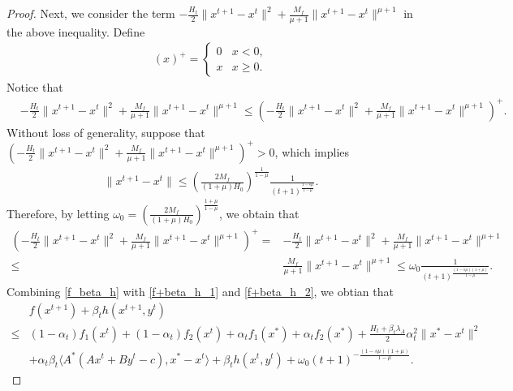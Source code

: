 \documentclass{article}
\numberwithin{equation}{section}
\begin{document}
\begin{proof}
    Next, we consider the term $-\frac{H_t}{2}\|x^{t+1}-x^t\rVert^2 +\frac{M_f}{\mu+1}\|x^{t+1}-x^t\rVert^{\mu+1}$ in 
    the above inequality. 
    Define 
    \begin{align}
        (x)^+ = \left\{ 
        \begin{array}{cc}
            0  & x<0,  \nonumber \\
            x & x \geq 0.  \nonumber
        \end{array}
     \right.  \nonumber
    \end{align}
    Notice that 
    \begin{align}
        &-\frac{H_t}{2}\|x^{t+1}-x^t\rVert^2 +\frac{M_f}{\mu+1}\|x^{t+1}-x^t\rVert^{\mu+1} \leq \left(-\frac{H_t}{2}\|x^{t+1}-x^t\rVert^2 +\frac{M_f}{\mu+1}\|x^{t+1}-x^t\rVert^{\mu+1}\right)^+.
        \label{f+beta_h_1}
    \end{align}
    Without loss of generality, suppose that  $\left(-\frac{H_t}{2}\|x^{t+1}-x^t\rVert^2 +\frac{M_f}{\mu+1}\|x^{t+1}-x^t\rVert^{\mu+1}\right)^+ >0$, 
    which implies
    \begin{align}
        \|x^{t+1}-x^t\rVert \leq \left(\frac{2M_f}{(1+\mu)H_0}\right)^{\frac{1}{1-\mu}}\frac{1}{(t+1)^{\frac{1-s\mu}{1-\mu}}}. 
    \end{align}
    Therefore, by letting $\omega_0 = \left(\frac{2M_f}{(1+\mu)H_0}\right)^{\frac{1+\mu}{1-\mu}}$, we obtain that 
    \begin{align}
        \left(-\frac{H_t}{2}\|x^{t+1}-x^t\rVert^2 +\frac{M_f}{\mu+1}\|x^{t+1}-x^t\rVert^{\mu+1}\right)^+ =& -\frac{H_t}{2}\|x^{t+1}-x^t\rVert^2 +\frac{M_f}{\mu+1}\|x^{t+1}-x^t\rVert^{\mu+1} \nonumber \\
        \leq& \frac{M_f}{\mu+1}\|x^{t+1}-x^t\rVert^{\mu+1} \leq \omega_0 \frac{1}{(t+1)^{\frac{(1-s\mu)(1+\mu)}{1-\mu}}}. 
        \label{f+beta_h_2}
    \end{align}
    Combining \eqref{f_beta_h} with \eqref{f+beta_h_1} and \eqref{f+beta_h_2}, we obtian that 
    \begin{align} 
        &f(x^{t+1}) +\beta_th(x^{t+1},y^t) \nonumber \\
        \leq & (1-\alpha_t)f_1(x^t)+(1-\alpha_t)f_2(x^t) +\alpha_t f_1(x^*)+\alpha_tf_2(x^*)+\frac{H_t+\beta_t\lambda_A}{2}\alpha_t^2\|x^*-x^t\rVert^2 \nonumber \\
        &+\alpha_t\beta_t\langle A^*(Ax^t+By^t-c), x^*-x^t\rangle + \beta_th(x^t,y^t) +\omega_0(t+1)^{-\frac{(1-s\mu)(1+\mu)}{1-\mu}}.  \label{f+beta_h_holder}
    \end{align}  
    

\end{proof}
\end{document}
